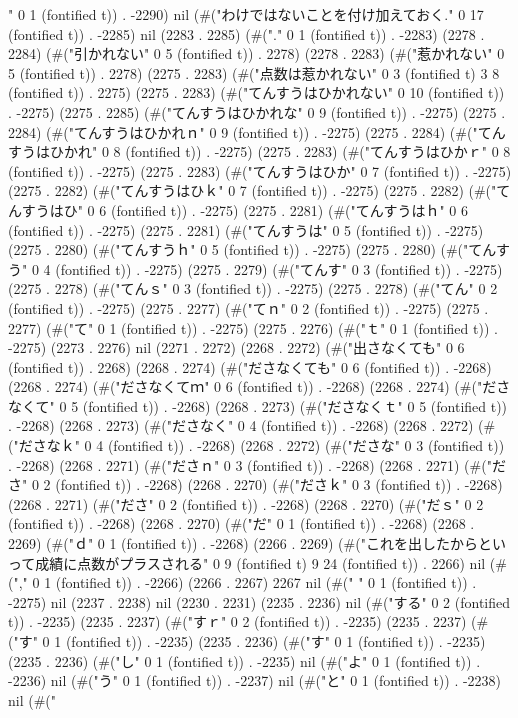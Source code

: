" 0 1 (fontified t)) . -2290) nil (#("わけではないことを付け加えておく." 0 17 (fontified t)) . -2285) nil (2283 . 2285) (#("." 0 1 (fontified t)) . -2283) (2278 . 2284) (#("引かれない" 0 5 (fontified t)) . 2278) (2278 . 2283) (#("惹かれない" 0 5 (fontified t)) . 2278) (2275 . 2283) (#("点数は惹かれない" 0 3 (fontified t) 3 8 (fontified t)) . 2275) (2275 . 2283) (#("てんすうはひかれない" 0 10 (fontified t)) . -2275) (2275 . 2285) (#("てんすうはひかれな" 0 9 (fontified t)) . -2275) (2275 . 2284) (#("てんすうはひかれｎ" 0 9 (fontified t)) . -2275) (2275 . 2284) (#("てんすうはひかれ" 0 8 (fontified t)) . -2275) (2275 . 2283) (#("てんすうはひかｒ" 0 8 (fontified t)) . -2275) (2275 . 2283) (#("てんすうはひか" 0 7 (fontified t)) . -2275) (2275 . 2282) (#("てんすうはひｋ" 0 7 (fontified t)) . -2275) (2275 . 2282) (#("てんすうはひ" 0 6 (fontified t)) . -2275) (2275 . 2281) (#("てんすうはｈ" 0 6 (fontified t)) . -2275) (2275 . 2281) (#("てんすうは" 0 5 (fontified t)) . -2275) (2275 . 2280) (#("てんすうｈ" 0 5 (fontified t)) . -2275) (2275 . 2280) (#("てんすう" 0 4 (fontified t)) . -2275) (2275 . 2279) (#("てんす" 0 3 (fontified t)) . -2275) (2275 . 2278) (#("てんｓ" 0 3 (fontified t)) . -2275) (2275 . 2278) (#("てん" 0 2 (fontified t)) . -2275) (2275 . 2277) (#("てｎ" 0 2 (fontified t)) . -2275) (2275 . 2277) (#("て" 0 1 (fontified t)) . -2275) (2275 . 2276) (#("ｔ" 0 1 (fontified t)) . -2275) (2273 . 2276) nil (2271 . 2272) (2268 . 2272) (#("出さなくても" 0 6 (fontified t)) . 2268) (2268 . 2274) (#("ださなくても" 0 6 (fontified t)) . -2268) (2268 . 2274) (#("ださなくてｍ" 0 6 (fontified t)) . -2268) (2268 . 2274) (#("ださなくて" 0 5 (fontified t)) . -2268) (2268 . 2273) (#("ださなくｔ" 0 5 (fontified t)) . -2268) (2268 . 2273) (#("ださなく" 0 4 (fontified t)) . -2268) (2268 . 2272) (#("ださなｋ" 0 4 (fontified t)) . -2268) (2268 . 2272) (#("ださな" 0 3 (fontified t)) . -2268) (2268 . 2271) (#("ださｎ" 0 3 (fontified t)) . -2268) (2268 . 2271) (#("ださ" 0 2 (fontified t)) . -2268) (2268 . 2270) (#("ださｋ" 0 3 (fontified t)) . -2268) (2268 . 2271) (#("ださ" 0 2 (fontified t)) . -2268) (2268 . 2270) (#("だｓ" 0 2 (fontified t)) . -2268) (2268 . 2270) (#("だ" 0 1 (fontified t)) . -2268) (2268 . 2269) (#("ｄ" 0 1 (fontified t)) . -2268) (2266 . 2269) (#("これを出したからといって成績に点数がプラスされる" 0 9 (fontified t) 9 24 (fontified t)) . 2266) nil (#("," 0 1 (fontified t)) . -2266) (2266 . 2267) 2267 nil (#("
" 0 1 (fontified t)) . -2275) nil (2237 . 2238) nil (2230 . 2231) (2235 . 2236) nil (#("する" 0 2 (fontified t)) . -2235) (2235 . 2237) (#("すｒ" 0 2 (fontified t)) . -2235) (2235 . 2237) (#("す" 0 1 (fontified t)) . -2235) (2235 . 2236) (#("す" 0 1 (fontified t)) . -2235) (2235 . 2236) (#("し" 0 1 (fontified t)) . -2235) nil (#("よ" 0 1 (fontified t)) . -2236) nil (#("う" 0 1 (fontified t)) . -2237) nil (#("と" 0 1 (fontified t)) . -2238) nil (#("
